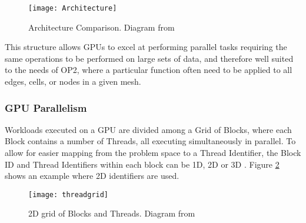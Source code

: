 \begin{figure}[h]
  \centering
  \texttt{[image: Architecture]}
  \caption{\label{fig:arch} Architecture Comparison. Diagram from \cite[p3]{guide}}
\end{figure}

\par
This structure allows GPUs to excel at performing parallel tasks requiring the same operations to be performed on large sets of data, and therefore well suited to the needs of OP2, where a particular function often need to be applied to all edges, cells, or nodes in a given mesh.

\subsubsection{GPU Parallelism}
Workloads executed on a GPU are divided among a Grid of Blocks, where each Block contains a number of Threads, all executing simultaneously in parallel. To allow for easier mapping from the problem space to a Thread Identifier, the Block ID and Thread Identifiers within each block can be 1D, 2D or 3D \cite[p9]{guide}. Figure \ref{fig:threadgrid} shows an example where 2D identifiers are used.

\begin{figure}[h!]
  \centering
  \texttt{[image: threadgrid]}
  \caption{\label{fig:threadgrid} 2D grid of Blocks and Threads. Diagram from \cite[p9]{guide}}
\end{figure}

